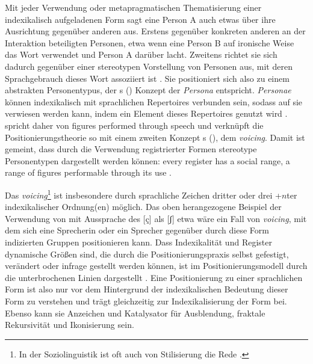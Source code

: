 Mit jeder Verwendung oder metapragmatischen Thematisierung einer indexikalisch aufgeladenen Form sagt eine Person A auch etwas über ihre Ausrichtung gegenüber anderen aus. 
Erstens gegenüber konkreten anderen an der Interaktion beteiligten Personen, etwa wenn eine Person B auf ironische Weise das Wort  verwendet und Person A darüber lacht. 
Zweitens richtet sie sich dadurch gegenüber einer stereotypen Vorstellung von Personen aus, mit deren Sprachgebrauch dieses Wort assoziiert ist \citep[s.][119]{Gal.2016}. 
Sie positioniert sich also zu einem abstrakten Personentypus, der \citeauthor{Bachtin.1990}s (\citeyear{Bachtin.1990}) Konzept der \textit{Persona} entspricht. 
\textit{Personae} können indexikalisch mit sprachlichen Repertoires verbunden sein, sodass auf sie verwiesen werden kann, indem ein Element dieses Repertoires genutzt wird \citep[s.][118]{Gal.2016}. \citet[39]
{Agha2005} spricht daher von \glqq figures performed through speech\grqq{} und verknüpft die Positionierungstheorie so mit einem zweiten Konzept \citeauthor{Bachtin.1990}s (\citeyear{Bachtin.1990}), dem \textit{voicing}. Damit ist gemeint, dass durch die Verwendung registrierter Formen stereotype Personentypen dargestellt werden können: \glqq every register has a social range, a range of figures performable through its use\grqq{} \citep[39]{Agha2005}. 

Das \textit{voicing}\footnote{In der Soziolinguistik ist oft auch von Stilisierung die Rede \citep[s. bspw.][]{Coupland.2007}.} ist insbesondere durch sprachliche Zeichen dritter oder drei +$n$ter indexikalischer Ordnung(en) möglich. 
Das oben herangezogene Beispiel der Verwendung von  mit Aussprache des [\c{c}] als [ʃ] etwa wäre ein Fall von \textit{voicing}, mit dem sich eine Sprecherin oder ein Sprecher gegenüber durch diese Form indizierten Gruppen positionieren kann. 
Dass Indexikalität und Register dynamische Größen sind, die durch die Positionierungspraxis selbst gefestigt, verändert oder infrage gestellt werden können, ist im Positionierungsmodell durch die unterbrochenen Linien dargestellt \citep[s.][273]{Spitzmuller2013}. 
Eine Positionierung zu einer sprachlichen Form ist also nur vor dem Hintergrund der indexikalischen Bedeutung dieser Form zu verstehen und trägt gleichzeitig zur Indexikalisierung der Form bei. 
Ebenso kann sie Anzeichen und Katalysator für Ausblendung, fraktale Rekursivität und Ikonisierung sein. 

